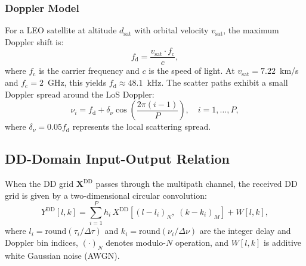\subsubsection{Doppler Model}
For a LEO satellite at altitude $d_{\mathrm{sat}}$ with orbital velocity $v_{\mathrm{sat}}$, the maximum Doppler shift is:
\begin{equation}\label{eq:fd_max}
  f_{\mathrm{d}} = \frac{v_{\mathrm{sat}} \cdot f_{\mathrm{c}}}{c},
\end{equation}
where $f_{\mathrm{c}}$ is the carrier frequency and $c$ is the speed of light. At $v_{\mathrm{sat}} = 7.22$~km/s and $f_{\mathrm{c}} = 2$~GHz, this yields $f_{\mathrm{d}} \approx 48.1$~kHz. The scatter paths exhibit a small Doppler spread around the LoS Doppler:
\begin{equation}\label{eq:doppler_scatter}
  \nu_i = f_{\mathrm{d}} + \delta_{\nu} \cos\!\left(\frac{2\pi(i-1)}{P}\right), \quad i = 1, \ldots, P,
\end{equation}
where $\delta_{\nu} = 0.05 f_{\mathrm{d}}$ represents the local scattering spread.

\subsection{DD-Domain Input-Output Relation}

When the DD grid $\mathbf{X}^{\mathrm{DD}}$ passes through the multipath channel, the received DD grid is given by a two-dimensional circular convolution:
\begin{equation}\label{eq:dd_io}
  Y^{\mathrm{DD}}[l,k] = \sum_{i=1}^{P} h_i\, X^{\mathrm{DD}}\!\left[(l - l_i)_N,\; (k - k_i)_M \right] + W[l,k],
\end{equation}
where $l_i = \mathrm{round}(\tau_i / \Delta\tau)$ and $k_i = \mathrm{round}(\nu_i / \Delta\nu)$ are the integer delay and Doppler bin indices, $(\cdot)_N$ denotes modulo-$N$ operation, and $W[l,k]$ is additive white Gaussian noise (AWGN).


